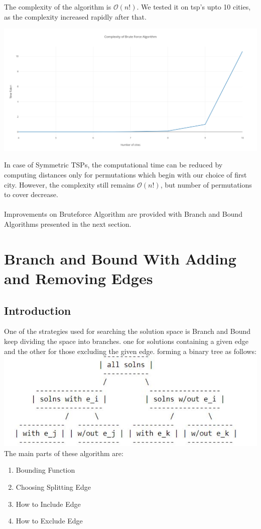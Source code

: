 \documentclass[14pt, english]{article}
\begin{document}
\noindent
The complexity of the algorithm is $\mathcal{O}(n!)$. We tested it on tsp's upto 10 cities, as the complexity increased rapidly after that.

\begin{center}
\includegraphics[scale=0.3]{bruteforce.png}
\end{center}

\noindent
In case of Symmetric TSPs, the computational time can be reduced by computing distances only for permutations which begin with our choice of first city. However, the complexity still remains $\mathcal{O}(n!)$, but number of permutations to cover decrease.\\
\\
\noindent
Improvements on Bruteforce Algorithm are provided with Branch and Bound Algorithms presented in the next section.

\newpage
\section{Branch and Bound With Adding and Removing Edges}
\subsection{Introduction}
One of the strategies used for searching the solution space is Branch and Bound keep dividing the space into branches. one for solutions containing a given edge and the other for those excluding the given edge. forming a binary tree as follows:
\newline \newline
\includegraphics[width=\textwidth] {solution-tree.jpg}
\newline \newline
The main parts of these algorithm are:
\begin{enumerate}
    \item Bounding Function
    \item Choosing Splitting Edge
    \item How to Include Edge
    \item How to Exclude Edge
\end{enumerate}
\end{document}
